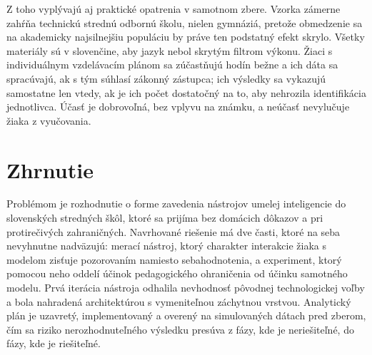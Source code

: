 Z toho vyplývajú aj praktické opatrenia v samotnom zbere. Vzorka zámerne zahŕňa technickú strednú odbornú školu, nielen gymnáziá, pretože obmedzenie sa na akademicky najsilnejšiu populáciu by práve ten podstatný efekt skrylo. Všetky materiály sú v slovenčine, aby jazyk nebol skrytým filtrom výkonu. Žiaci s individuálnym vzdelávacím plánom sa zúčastňujú hodín bežne a ich dáta sa spracúvajú, ak s tým súhlasí zákonný zástupca; ich výsledky sa vykazujú samostatne len vtedy, ak je ich počet dostatočný na to, aby nehrozila identifikácia jednotlivca. Účasť je dobrovoľná, bez vplyvu na známku, a neúčasť nevylučuje žiaka z vyučovania.

\section*{Zhrnutie}

Problémom je rozhodnutie o forme zavedenia nástrojov umelej inteligencie do slovenských stredných škôl, ktoré sa prijíma bez domácich dôkazov a pri protirečivých zahraničných. Navrhované riešenie má dve časti, ktoré na seba nevyhnutne nadväzujú: merací nástroj, ktorý charakter interakcie žiaka s modelom zisťuje pozorovaním namiesto sebahodnotenia, a experiment, ktorý pomocou neho oddelí účinok pedagogického ohraničenia od účinku samotného modelu. Prvá iterácia nástroja odhalila nevhodnosť pôvodnej technologickej voľby a bola nahradená architektúrou s vymeniteľnou záchytnou vrstvou. Analytický plán je uzavretý, implementovaný a overený na simulovaných dátach pred zberom, čím sa riziko nerozhodnuteľného výsledku presúva z fázy, kde je neriešiteľné, do fázy, kde je riešiteľné.
